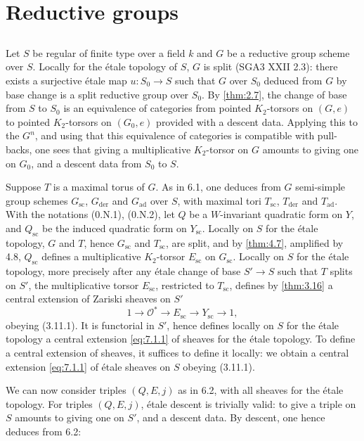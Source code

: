 \documentclass[11pt,a4paper]{article}
\theoremstyle{plain}
\theoremstyle{definition}
\newcommand{\cO}{\mathcal{O}}
\newcommand{\der}{\mathrm{der}}
\newcommand{\scu}{\mathrm{sc}}
\newcommand{\ad}{\mathrm{ad}}
\begin{document}
\section{Reductive groups}

\subsection{}
Let $S$ be regular of finite type over a field $k$ and $G$ be a reductive group scheme over $S$. Locally for the \'etale topology of $S$, $G$ is split (SGA3 XXII 2.3): there exists a surjective \'etale map $u: S_0 \to S$ such that $G$ over $S_0$ deduced from $G$ by base change is a split reductive group over $S_0$. By \ref{thm:2.7}, the change of base from $S$ to $S_0$ is an equivalence of categories from pointed $K_2$-torsors on $(G,e)$ to pointed $K_2$-torsors on $(G_0, e)$ provided with a descent data. Applying this to the $G^n$, and using that this equivalence of categories is compatible with pull-backs, one sees that giving a multiplicative $K_2$-torsor on $G$ amounts to giving one on $G_0$, and a descent data from $S_0$ to $S$.

Suppose $T$ is a maximal torus of $G$. As in 6.1, one deduces from $G$ semi-simple group schemes $G_\scu$, $G_\der$ and $G_\ad$ over $S$, with maximal tori $T_\scu$, $T_\der$ and $T_\ad$. With the notations (0.N.1), (0.N.2), let $Q$ be a $W$-invariant quadratic form on $Y$, and $Q_\scu$ be the induced quadratic form on $Y_\scu$. Locally on $S$ for the \'etale topology, $G$ and $T$, hence $G_\scu$ and $T_\scu$, are split, and by \ref{thm:4.7}, amplified by 4.8, $Q_\scu$ defines a multiplicative $K_2$-torsor $E_\scu$ on $G_\scu$. Locally on $S$ for the \'etale topology, more precisely after any \'etale change of base $S' \to S$ such that $T$ splits on $S'$, the multiplicative torsor $E_\scu$, restricted to $T_\scu$, defines by \ref{thm:3.16} a central extension of Zariski sheaves on $S'$
\begin{equation}\label{eq:7.1.1}
1 \to \cO^* \to E_\scu \to Y_\scu \to 1,
\end{equation}
obeying (3.11.1). It is functorial in $S'$, hence defines locally on $S$ for the \'etale topology a central extension \eqref{eq:7.1.1} of sheaves for the \'etale topology. To define a central extension of sheaves, it suffices to define it locally: we obtain a central extension \eqref{eq:7.1.1} of \'etale sheaves on $S$ obeying (3.11.1).

We can now consider triples $(Q, E, j)$ as in 6.2, with all sheaves for the \'etale topology. For triples $(Q, E, j)$, \'etale descent is trivially valid: to give a triple on $S$ amounts to giving one on $S'$, and a descent data. By descent, one hence deduces from 6.2:
\end{document}
